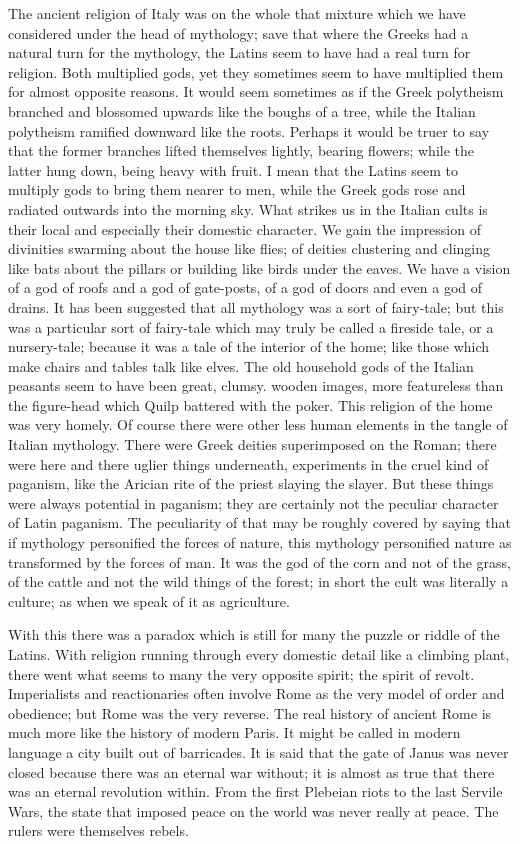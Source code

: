 The ancient religion of Italy was on the whole that mixture which we have considered under the head of mythology; save that where the Greeks had a natural turn for the mythology, the Latins seem to have had a real turn for religion. Both multiplied gods, yet they sometimes seem to have multiplied them for almost opposite reasons. It would seem sometimes as if the Greek polytheism branched and blossomed upwards like the boughs of a tree, while the Italian polytheism ramified downward like the roots. Perhaps it would be truer to say that the former branches lifted themselves lightly, bearing flowers; while the latter hung down, being heavy with fruit. I mean that the Latins seem to multiply gods to bring them nearer to men, while the Greek gods rose and radiated outwards into the morning sky. What strikes us in the Italian cults is their local and especially their domestic character. We gain the impression of divinities swarming about the house like flies; of deities clustering and clinging like bats about the pillars or building like birds under the eaves. We have a vision of a god of roofs and a god of gate-posts, of a god of doors and even a god of drains. It has been suggested that all mythology was a sort of fairy-tale; but this was a particular sort of fairy-tale which may truly be called a fireside tale, or a nursery-tale; because it was a tale of the interior of the home; like those which make chairs and tables talk like elves. The old household gods of the Italian peasants seem to have been great, clumsy. wooden images, more featureless than the figure-head which Quilp battered with the poker. This religion of the home was very homely. Of course there were other less human elements in the tangle of Italian mythology. There were Greek deities superimposed on the Roman; there were here and there uglier things underneath, experiments in the cruel kind of paganism, like the Arician rite of the priest slaying the slayer. But these things were always potential in paganism; they are certainly not the peculiar character of Latin paganism. The peculiarity of that may be roughly covered by saying that if mythology personified the forces of nature, this mythology personified nature as transformed by the forces of man. It was the god of the corn and not of the grass, of the cattle and not the wild things of the forest; in short the cult was literally a culture; as when we speak of it as agriculture.

With this there was a paradox which is still for many the puzzle or riddle of the Latins. With religion running through every domestic detail like a climbing plant, there went what seems to many the very opposite spirit; the spirit of revolt. Imperialists and reactionaries often involve Rome as the very model of order and obedience; but Rome was the very reverse. The real history of ancient Rome is much more like the history of modern Paris. It might be called in modern language a city built out of barricades. It is said that the gate of Janus was never closed because there was an eternal war without; it is almost as true that there was an eternal revolution within. From the first Plebeian riots to the last Servile Wars, the state that imposed peace on the world was never really at peace. The rulers were themselves rebels.

